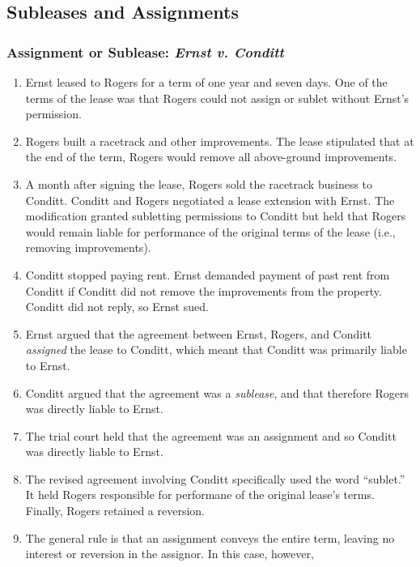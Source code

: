 \subsection{Subleases and Assignments}

\subsubsection{Assignment or Sublease: \emph{Ernst v. Conditt}}

\begin{enumerate}
    \item Ernst leased to Rogers for a term of one year and seven days. One of 
    the terms of the lease was that Rogers could not assign or sublet without 
    Ernst's permission.
    \item Rogers built a racetrack and other improvements. The lease 
    stipulated that at the end of the term, Rogers would remove all 
    above-ground improvements.
    \item A month after signing the lease, Rogers sold the racetrack business 
    to Conditt. Conditt and Rogers negotiated a lease extension with Ernst. 
    The modification granted subletting permissions to Conditt but held that 
    Rogers would remain liable for performance of the original terms of the 
    lease (i.e., removing improvements).
    \item Conditt stopped paying rent. Ernst demanded payment of past rent 
    from Conditt if Conditt did not remove the improvements from the property. 
    Conditt did not reply, so Ernst sued.
    \item Ernst argued that the agreement between Ernst, Rogers, and Conditt 
    \emph{assigned} the lease to Conditt, which meant that Conditt was 
    primarily liable to Ernst.
    \item Conditt argued that the agreement was a \emph{sublease}, and that 
    therefore Rogers was directly liable to Ernst.
    \item The trial court held that the agreement was an assignment and so 
    Conditt was directly liable to Ernst.
    \item The revised agreement involving Conditt specifically used the word 
    ``sublet.'' It held Rogers responsible for performane of the original 
    lease's terms. Finally, Rogers retained a reversion.
    \item The general rule is that an assignment conveys the entire term, 
    leaving no interest or reversion in the assignor. In this case, however, 

\end{enumerate}
